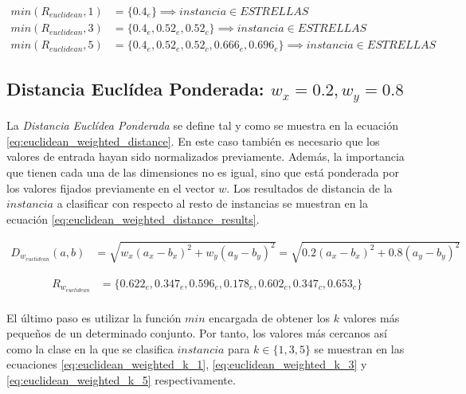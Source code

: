 \documentclass{article}
\begin{document}
			\begin{align}
			\label{eq:euclidean_k_1}
				min(R_{euclidean},1) &= \{ 0.4_e \} \implies instancia \in ESTRELLAS \\
			\label{eq:euclidean_k_3}
				min(R_{euclidean},3) &= \{ 0.4_e, 0.52_e, 0.52_c\} \implies instancia \in ESTRELLAS \\
			\label{eq:euclidean_k_5}
				min(R_{euclidean},5) &= \{ 0.4_e, 0.52_e, 0.52_c, 0.666_e,  0.696_e \} \implies instancia \in ESTRELLAS
			\end{align}

		\subsection{Distancia Euclídea Ponderada: $w_x=0.2, w_y=0.8$}
		\label{sec:euclidean_weighted}

			\paragraph{}
			La \emph{Distancia Euclídea Ponderada} se define tal y como se muestra en la ecuación \eqref{eq:euclidean_weighted_distance}. En este caso también es necesario que los valores de entrada hayan sido normalizados previamente. Además, la importancia que tienen cada una de las dimensiones no es igual, sino que está ponderada por los valores fijados previamente en el vector $w$. Los resultados de distancia de la $instancia$ a clasificar con respecto al resto de instancias se muestran en la ecuación \eqref{eq:euclidean_weighted_distance_results}.

			\begin{align}
			\label{eq:euclidean_weighted_distance}
				D_{w_{euclidean}}(a,b) &= \sqrt{w_x(a_x - b_x)^2 + w_y(a_y - b_y)^2} = \sqrt{0.2(a_x - b_x)^2 + 0.8(a_y - b_y)^2}
			\end{align}

			\begin{align}
			\label{eq:euclidean_weighted_distance_results}
				R_{w_{euclidean}} &= \{0.622_e, 0.347_e, 0.596_e, 0.178_e, 0.602_c, 0.347_c, 0.653_c\}
			\end{align}

			\paragraph{}
			El último paso es utilizar la función $min$ encargada de obtener los $k$ valores más pequeños de un determinado conjunto. Por tanto, los valores más cercanos así como la clase en la que se clasifica $instancia$ para $k \in \{1,3,5\}$ se muestran en las ecuaciones \eqref{eq:euclidean_weighted_k_1}, \eqref{eq:euclidean_weighted_k_3} y \eqref{eq:euclidean_weighted_k_5} respectivamente.
\end{document}
